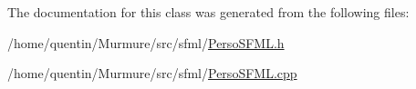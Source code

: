 The documentation for this class was generated from the following files\+:\begin{DoxyCompactItemize}
\item 
/home/quentin/\+Murmure/src/sfml/\hyperlink{PersoSFML_8h}{Perso\+S\+F\+M\+L.\+h}\item 
/home/quentin/\+Murmure/src/sfml/\hyperlink{PersoSFML_8cpp}{Perso\+S\+F\+M\+L.\+cpp}\end{DoxyCompactItemize}
